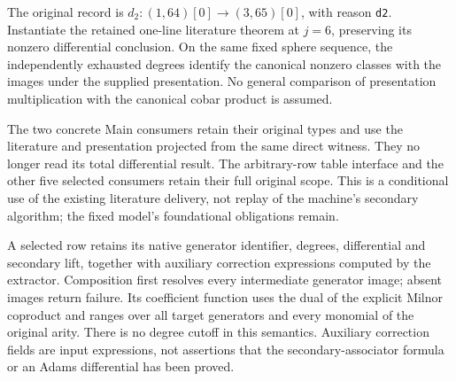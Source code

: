 \begin{proposition}
  \label{prop:lin-h6-one-line-producer}
  \notready
  The original record is $d_2:(1,64)[0]\to(3,65)[0]$, with reason
  \texttt{d2}. Instantiate the retained one-line literature theorem at
  $j=6$, preserving its nonzero differential conclusion. On the same fixed
  sphere sequence, the independently exhausted degrees identify the
  canonical nonzero classes with the images under the supplied presentation.
  No general comparison of presentation multiplication with the canonical
  cobar product is assumed.

  The two concrete Main consumers retain their original types and use
  the literature and presentation projected from the same direct witness.
  They no longer read its total differential result. The arbitrary-row
  table interface and the other five selected consumers retain their full
  original scope. This is a conditional use of the existing literature
  delivery, not replay of the machine's secondary algorithm; the fixed
  model's foundational obligations remain.
\end{proposition}

\begin{definition}
  \label{def:lin-secondary-native-composition}
  A selected row retains its native generator identifier, degrees,
  differential and secondary lift, together with auxiliary correction
  expressions computed by the extractor.
  Composition first resolves every intermediate generator image; absent
  images return failure. Its coefficient function uses the dual of the
  explicit Milnor coproduct and ranges over all target generators and every
  monomial of the original arity. There is no degree cutoff in this semantics.
  Auxiliary correction fields are input expressions, not assertions that
  the secondary-associator formula or an Adams differential has been proved.
\end{definition}

